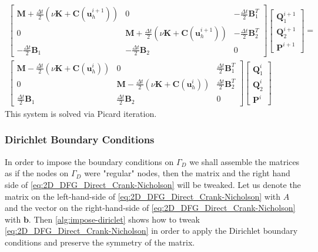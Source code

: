 \begin{multline}\label{eq:2D_DFG_Direct_Crank-Nicholson}
	\begin{bmatrix}
		\mathbf{M}+\frac{\Delta t}{2}\left(\nu\mathbf{K}+\mathbf{C}(\mathbf{u}_h^{i+1})\right) & 0 & -\frac{\Delta t}{2}\mathbf{B}^T_1 \\
		0 &\mathbf{M}+\frac{\Delta t}{2}\left(\nu\mathbf{K}+\mathbf{C}(\mathbf{u}_h^{i+1})\right) & -\frac{\Delta t}{2}\mathbf{B}^T_2 \\
		-\frac{\Delta t}{2}\mathbf{B}_1 & -\frac{\Delta t}{2}\mathbf{B}_2 & 0
	\end{bmatrix}
	\begin{bmatrix}
		\mathbf{Q}_1^{i+1}\\
		\mathbf{Q}_2^{i+1}\\
		\mathbf{P}^{i+1}
	\end{bmatrix} = \\
	\begin{bmatrix}
		\mathbf{M}-\frac{\Delta t}{2}\left(\nu\mathbf{K}+\mathbf{C}(\mathbf{u}_h^{i})\right) & 0 & \frac{\Delta t}{2}\mathbf{B}^T_1 \\
		0 &\mathbf{M}-\frac{\Delta t}{2}\left(\nu\mathbf{K}+\mathbf{C}(\mathbf{u}_h^{i})\right) & \frac{\Delta t}{2}\mathbf{B}^T_2 \\
		\frac{\Delta t}{2}\mathbf{B}_1 & \frac{\Delta t}{2}\mathbf{B}_2 & 0
	\end{bmatrix}
	\begin{bmatrix}
		\mathbf{Q}_1^{i}\\
		\mathbf{Q}_2^{i}\\
		\mathbf{P}^{i}
	\end{bmatrix}
\end{multline}
This system is solved via Picard iteration.

\subsubsection{Dirichlet Boundary Conditions}
In order to impose the boundary conditions on $\Gamma_D$ we shall assemble the matrices as if the nodes on $\Gamma_D$ were "regular" nodes, then the matrix and the right hand side of \cref{eq:2D_DFG_Direct_Crank-Nicholson} will be tweaked. Let us denote the matrix on the left-hand-side of \cref{eq:2D_DFG_Direct_Crank-Nicholson} with $A$ and the vector on the right-hand-side of \cref{eq:2D_DFG_Direct_Crank-Nicholson} with $\mathbf{b}$. Then \cref{alg:impose-diriclet} shows how to tweak \cref{eq:2D_DFG_Direct_Crank-Nicholson} in order to apply the Dirichlet boundary conditions and preserve the symmetry of the matrix.

